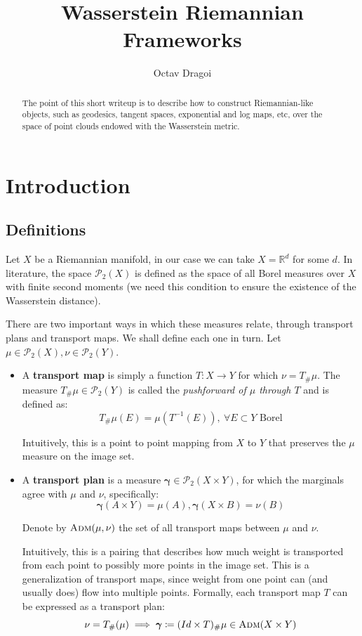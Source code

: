 \documentclass{article}
\begin{document}
\title{Wasserstein Riemannian Frameworks}
\author{Octav Dragoi}

\maketitle

\begin{abstract}
    The point of this short writeup is to describe how to construct
    Riemannian-like objects, such as geodesics, tangent spaces, 
    exponential and log maps, etc, over the space of point clouds
    endowed with the Wasserstein metric.
\end{abstract}

\section{Introduction}

\subsection{Definitions}
Let $X$ be a Riemannian manifold, in our case we can take $X=\mathbb{R}^d$
for some $d$. In literature, the space $\mathscr{P}_2(X)$ is
defined as the space of all Borel measures over $X$ with finite second moments
(we need this condition to ensure the existence of the Wasserstein distance).

There are two important ways in which these measures relate, through 
transport plans and transport maps. We shall define each one in turn. 
Let $\mu \in \mathscr{P}_2(X), \nu \in \mathscr{P}_2(Y)$.
\begin{itemize}
    \item A \textbf{transport map} is simply a function $T:X\rightarrow Y$
    for which $\nu = T_\#\mu$.  The measure $T_\#\mu\in \mathscr{P}_2(Y)$ is 
    called the \textit{pushforward of $\mu$ through $T$} and is defined as:
    \[T_\#\mu(E) = \mu(T^{-1}(E)),\ \forall E\subset Y\text{ Borel} \]

    Intuitively, this is a point to point mapping from $X$ to $Y$ that
    preserves the $\mu$ measure on the image set.

    \item A \textbf{transport plan} is a measure 
    $\bm\gamma \in \mathscr{P}_2(X\times Y)$,
    for which the marginals agree with $\mu$ and $\nu$, specifically:
    \[\bm\gamma(A\times Y) =\mu(A), \bm\gamma (X\times B) = \nu(B)\]

    Denote by $\textsc{Adm}(\mu, \nu)$ the set of all transport maps 
    between $\mu$ and $\nu$.

    Intuitively, this is a pairing that describes how much weight 
    is transported from each point to possibly more points in the image set.
    This is a generalization of transport maps, since weight from one point 
    can (and usually does) flow into multiple points. Formally,
    each transport map $T$ can be expressed as a transport plan:
    \[\nu = T_\#(\mu)\implies \bm\gamma \coloneqq (Id\times T)_\#\mu\in\textsc{Adm}(X\times Y) \]
\end{itemize}
\end{document}
